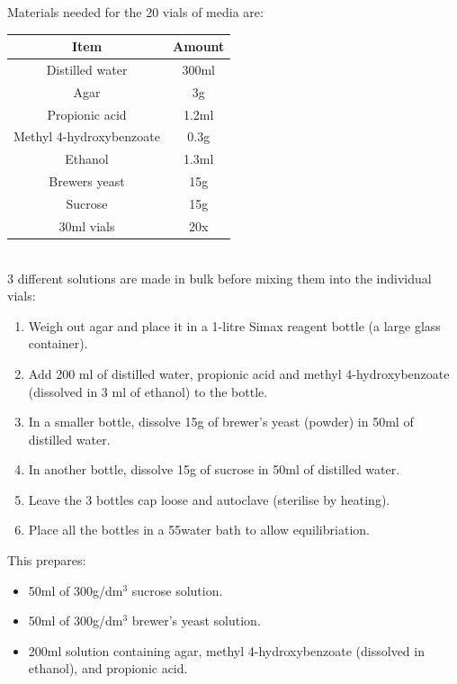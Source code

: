 \documentclass{article}
\begin{document}
Materials needed for the 20 vials of media are:\\

{
\centering
\begin{tabular}{|c|c|}
  \hline
  Item & Amount\\
  \hline
  \hline
  Distilled water & 300ml\\
  Agar & 3g\\
  Propionic acid & 1.2ml\\
  Methyl 4-hydroxybenzoate & 0.3g\\
  Ethanol & 1.3ml\\
  Brewers yeast & 15g\\
  Sucrose & 15g\\
  30ml vials & 20x\\
  \hline
\end{tabular}
\par
}

\noindent\\
3 different solutions are made in bulk before mixing them into the individual vials:

\begin{enumerate}
    \item Weigh out agar and place it in a 1-litre Simax reagent bottle (a large glass container).
    \item Add 200 ml of distilled water, propionic acid and methyl 4-hydroxybenzoate (dissolved in 3 ml of ethanol) to the bottle.
    \item In a smaller bottle, dissolve 15g of brewer's yeast (powder) in 50ml of distilled water.
    \item In another bottle, dissolve 15g of sucrose in 50ml of distilled water.
    \item Leave the 3 bottles cap loose and autoclave (sterilise by heating).
    \item Place all the bottles in a 55\textcelsius\space water bath to allow equilibriation.
\end{enumerate}

\newpage
\noindent
This prepares:

\begin{itemize}
    \item 50ml of 300g/dm$^3$ sucrose solution.
    \item 50ml of 300g/dm$^3$ brewer's yeast solution.
    \item 200ml solution containing agar, methyl 4-hydroxybenzoate (dissolved in ethanol), and propionic acid.
\end{itemize}
\end{document}
